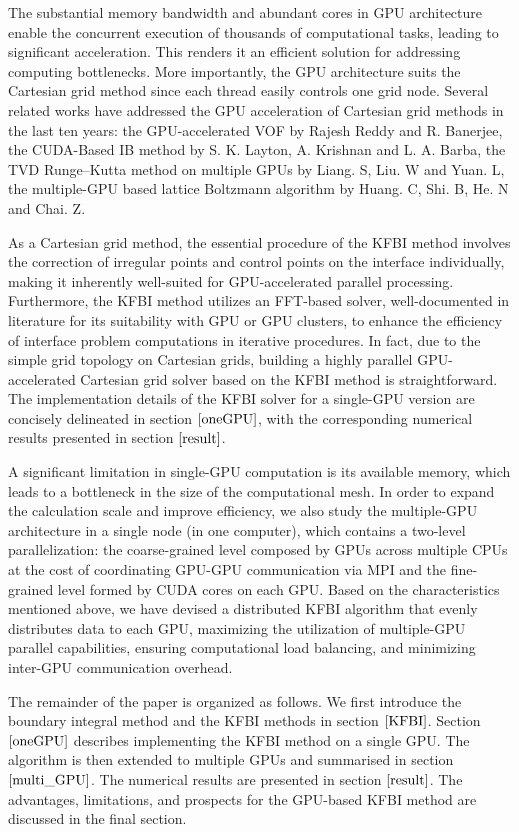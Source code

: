 The substantial memory bandwidth and abundant cores in GPU architecture enable the concurrent execution of thousands of computational tasks, leading to significant acceleration. This renders it an efficient solution for addressing computing bottlenecks. More importantly, the GPU architecture suits the Cartesian grid method since each thread easily controls one grid node. Several related works have addressed the GPU acceleration of Cartesian grid methods in the last ten years\cite{REDDY2015287,cuIBM2018Layton, LIANG2014156Solving, huang2015implementation}: the GPU-accelerated VOF by Rajesh Reddy and R. Banerjee\cite{REDDY2015287}, the CUDA-Based IB method by S. K. Layton, A. Krishnan and L. A. Barba\cite{cuIBM2018Layton}, the TVD Runge–Kutta method on multiple GPUs by Liang. S,  Liu. W and Yuan. L\cite{LIANG2014156Solving}, the multiple-GPU based lattice Boltzmann algorithm by Huang. C, Shi. B, He. N and Chai. Z\cite{huang2015implementation}.

As a Cartesian grid method, the essential procedure of the KFBI method involves the correction of irregular points and control points on the interface individually, making it inherently well-suited for GPU-accelerated parallel processing. Furthermore, the KFBI method utilizes an FFT-based solver, well-documented in literature for its suitability with GPU or GPU clusters\cite{Volkov2011,Govindaraju2008,Nandapalan2012,Chen2010,Nukada2012}, to enhance the efficiency of interface problem computations in iterative procedures. In fact, due to the simple grid topology on Cartesian grids, building a highly parallel GPU-accelerated Cartesian grid solver based on the KFBI method is straightforward. The implementation details of the KFBI solver for a single-GPU version are concisely delineated in section $\ref{oneGPU}$, with the corresponding numerical results presented in section $\ref{result}$.


A significant limitation in single-GPU computation is its available memory, which leads to a bottleneck in the size of the computational mesh. In order to expand the calculation scale and improve efficiency, we also study the multiple-GPU architecture in a single node (in one computer), which contains a two-level parallelization: the coarse-grained level composed by GPUs across multiple CPUs at the cost of coordinating GPU-GPU communication via MPI and the fine-grained level formed by CUDA cores on each GPU. Based on the characteristics mentioned above, we have devised a distributed KFBI algorithm that evenly distributes data to each GPU, maximizing the utilization of multiple-GPU parallel capabilities, ensuring computational load balancing, and minimizing inter-GPU communication overhead.



The remainder of the paper is organized as follows. We first introduce  the boundary integral method and the KFBI methods in section $\ref{KFBI}$. Section $\ref{oneGPU}$ describes implementing the KFBI method on a single GPU. The algorithm is then extended to multiple GPUs and summarised in section $\ref{multi_GPU}$. The numerical results are presented in section $\ref{result}$. The advantages, limitations, and prospects for the GPU-based KFBI method are discussed in the final section. 
